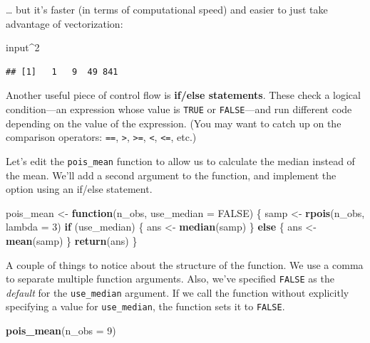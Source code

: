 \documentclass[12pt,oneside,openany]{book}
\newenvironment{Shaded}{\begin{snugshade}}{\end{snugshade}}
\newcommand{\KeywordTok}[1]{\textcolor[rgb]{0.13,0.29,0.53}{\textbf{#1}}}
\newcommand{\DataTypeTok}[1]{\textcolor[rgb]{0.13,0.29,0.53}{#1}}
\newcommand{\DecValTok}[1]{\textcolor[rgb]{0.00,0.00,0.81}{#1}}
\newcommand{\StringTok}[1]{\textcolor[rgb]{0.31,0.60,0.02}{#1}}
\newcommand{\OtherTok}[1]{\textcolor[rgb]{0.56,0.35,0.01}{#1}}
\newcommand{\ControlFlowTok}[1]{\textcolor[rgb]{0.13,0.29,0.53}{\textbf{#1}}}
\newcommand{\OperatorTok}[1]{\textcolor[rgb]{0.81,0.36,0.00}{\textbf{#1}}}
\newcommand{\NormalTok}[1]{#1}
\begin{document}
\ldots{} but it's faster (in terms of computational speed) and easier to
just take advantage of vectorization:

\begin{Shaded}
\begin{Highlighting}[]
\NormalTok{input}\OperatorTok{^}\DecValTok{2}
\end{Highlighting}
\end{Shaded}

\begin{verbatim}
## [1]   1   9  49 841
\end{verbatim}

Another useful piece of control flow is \textbf{if/else statements}.
These check a logical condition---an expression whose value is
\texttt{TRUE} or \texttt{FALSE}---and run different code depending on
the value of the expression. (You may want to catch up on the comparison
operators: \texttt{==}, \texttt{\textgreater{}},
\texttt{\textgreater{}=}, \texttt{\textless{}}, \texttt{\textless{}=},
etc.)

Let's edit the \texttt{pois\_mean} function to allow us to calculate the
median instead of the mean. We'll add a second argument to the function,
and implement the option using an if/else statement.

\begin{Shaded}
\begin{Highlighting}[]
\NormalTok{pois_mean <-}\StringTok{ }\ControlFlowTok{function}\NormalTok{(n_obs, }\DataTypeTok{use_median =} \OtherTok{FALSE}\NormalTok{) \{}
\NormalTok{  samp <-}\StringTok{ }\KeywordTok{rpois}\NormalTok{(n_obs, }\DataTypeTok{lambda =} \DecValTok{3}\NormalTok{)}
  \ControlFlowTok{if}\NormalTok{ (use_median) \{}
\NormalTok{    ans <-}\StringTok{ }\KeywordTok{median}\NormalTok{(samp)}
\NormalTok{  \} }\ControlFlowTok{else}\NormalTok{ \{}
\NormalTok{    ans <-}\StringTok{ }\KeywordTok{mean}\NormalTok{(samp)}
\NormalTok{  \}}
  \KeywordTok{return}\NormalTok{(ans)}
\NormalTok{\}}
\end{Highlighting}
\end{Shaded}

A couple of things to notice about the structure of the function. We use
a comma to separate multiple function arguments. Also, we've specified
\texttt{FALSE} as the \emph{default} for the \texttt{use\_median}
argument. If we call the function without explicitly specifying a value
for \texttt{use\_median}, the function sets it to \texttt{FALSE}.

\begin{Shaded}
\begin{Highlighting}[]
\KeywordTok{pois_mean}\NormalTok{(}\DataTypeTok{n_obs =} \DecValTok{9}\NormalTok{)}
\end{Highlighting}
\end{Shaded}
\end{document}
